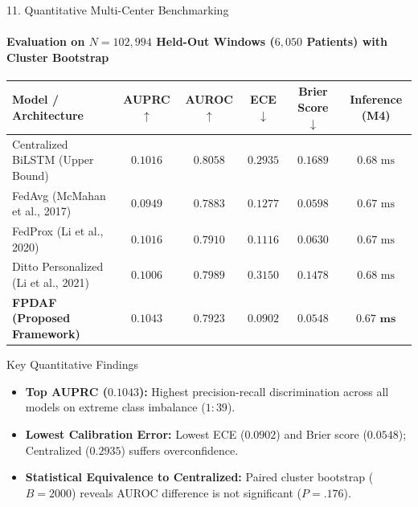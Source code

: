\documentclass[aspectratio=169, 10pt]{beamer}
\begin{document}
\begin{frame}{11. Quantitative Multi-Center Benchmarking}
    \framesubtitle{Evaluation on $N = 102,994$ Held-Out Windows ($6,050$ Patients) with Cluster Bootstrap}
    \begin{table}
        \centering
        \scriptsize
        \renewcommand{\arraystretch}{1.10}
        \begin{tabular}{l c c c c c}
            \toprule
            \textbf{Model / Architecture} & \textbf{AUPRC $\uparrow$} & \textbf{AUROC $\uparrow$} & \textbf{ECE $\downarrow$} & \textbf{Brier Score $\downarrow$} & \textbf{Inference (M4)} \\
            \midrule
            Centralized BiLSTM (Upper Bound) & $0.1016$ & $\mathbf{0.8058}$ & $0.2935$ & $0.1689$ & $0.68\text{ ms}$ \\
            FedAvg (McMahan et al., 2017) & $0.0949$ & $0.7883$ & $0.1277$ & $0.0598$ & $0.67\text{ ms}$ \\
            FedProx (Li et al., 2020) & $0.1016$ & $0.7910$ & $0.1116$ & $0.0630$ & $0.67\text{ ms}$ \\
            Ditto Personalized (Li et al., 2021) & $0.1006$ & $0.7989$ & $0.3150$ & $0.1478$ & $0.68\text{ ms}$ \\
            \midrule
            \textbf{\textcolor{amritaMaroon}{FPDAF (Proposed Framework)}} & $\mathbf{0.1043}$ & $0.7923$ & $\mathbf{0.0902}$ & $\mathbf{0.0548}$ & $\mathbf{0.67\text{ ms}}$ \\
            \bottomrule
        \end{tabular}
    \end{table}
    \vspace{0.05cm}

    \begin{block}{\scriptsize Key Quantitative Findings}
        \scriptsize
        \begin{itemize}
            \item \textbf{Top AUPRC ($0.1043$):} Highest precision-recall discrimination across all models on extreme class imbalance ($1:39$).
            \item \textbf{Lowest Calibration Error:} Lowest ECE ($\mathbf{0.0902}$) and Brier score ($\mathbf{0.0548}$); Centralized ($0.2935$) suffers overconfidence.
            \item \textbf{Statistical Equivalence to Centralized:} Paired cluster bootstrap ($B=2000$) reveals AUROC difference is not significant ($P = .176$).
        \end{itemize}
    \end{block}
\end{frame}
\end{document}
